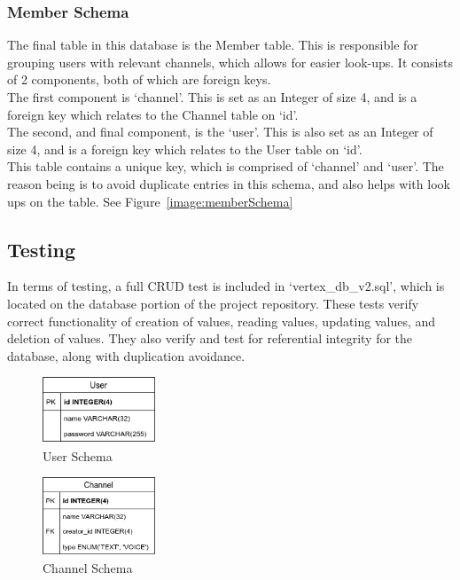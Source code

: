 \subsubsection{Member Schema}
The final table in this database is the Member table. This is responsible for grouping users with relevant channels, which allows for easier look-ups. It consists of 2 components, both of which are foreign keys.
\\ The first component is ‘channel’. This is set as an Integer of size 4, and is a  foreign key which relates to the Channel table on ‘id’.
\\ The second, and final component, is the ‘user’. This is also set as an Integer of size 4, and is a foreign key which relates to the User table on ‘id’.
\\ This table contains a unique key, which is comprised of  ‘channel’ and ‘user’. The reason being is to avoid duplicate entries in this schema, and also helps with look ups on the table.
See Figure~\ref{image:memberSchema}

\subsection{Testing}
In terms of testing, a full CRUD test is included in ‘vertex\_db\_v2.sql’, which is located on the database portion of the project repository. These tests verify correct functionality of creation of values, reading values, updating values, and deletion of values. They also verify and test for referential integrity for the database, along with duplication avoidance.

\begin{figure}[h!]
    \caption{User Schema}
    \label{image:userSchema}
    \centering
    \includegraphics[width=0.3\textwidth]{images/UserSchema.png}
\end{figure}

\begin{figure}[h!]
    \caption{Channel Schema}
    \label{image:channelSchema}
    \centering
    \includegraphics[width=0.3\textwidth]{images/ChannelSchema.png}
\end{figure}

